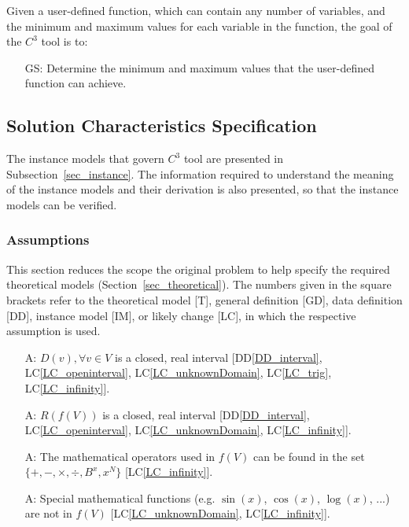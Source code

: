 \documentclass[12pt]{article}
\newcommand{\ddref}[1]{DD\ref{#1}}
\newcounter{assumpnum} %
\newcounter{goalnum} %
\newcommand{\lcref}[1]{LC\ref{#1}}
\newcommand{\prognameAbbrv}{$C^{3}$}
\begin{document}
\noindent Given a user-defined function, which can contain any number of 
variables, and the minimum and maximum values for each variable in the 
function, the goal of the \prognameAbbrv{} tool is to:

\begin{itemize}

\item[GS\refstepcounter{goalnum}\thegoalnum \label{G_range}:] Determine the 
minimum and maximum values that the user-defined function can achieve.


\end{itemize}

\subsection{Solution Characteristics Specification}
The instance models that govern \prognameAbbrv{} tool are presented in
Subsection~\ref{sec_instance}. The information required to understand the 
meaning of the instance models and their derivation is also presented, so that 
the instance models can be verified.

\subsubsection{Assumptions}
This section reduces the scope the original problem to help specify the 
required theoretical models (Section~\ref{sec_theoretical}). The numbers given 
in the square brackets refer to the theoretical model [T], general definition 
[GD], data definition [DD], instance model [IM], or likely change [LC], in 
which the respective assumption is used.

\begin{itemize}

\item[A\refstepcounter{assumpnum}\theassumpnum \label{A_domain}:] $D(v), 
\forall v \in V$ is a closed, real interval [\ddref{DD_interval}, 
\lcref{LC_openinterval}, \lcref{LC_unknownDomain}, \lcref{LC_trig}, 
\lcref{LC_infinity}]. 

\item[A\refstepcounter{assumpnum}\theassumpnum \label{A_interval}:] $R(f(V))$ 
is a closed, real interval [\ddref{DD_interval}, \lcref{LC_openinterval}, 
\lcref{LC_unknownDomain}, \lcref{LC_infinity}].

\item[A\refstepcounter{assumpnum}\theassumpnum \label{A_operators}:] The 
mathematical operators used in $f(V)$ can be found in the set $\{+, -, 
\times, \div, B^x, x^N \}$ [\lcref{LC_infinity}].

\item[A\refstepcounter{assumpnum}\theassumpnum \label{A_commonfunctions}:] 
Special mathematical functions (e.g. $\sin(x)$, $\cos(x)$, $\log(x)$, ...) are 
not in $f(V)$ [\lcref{LC_unknownDomain}, \lcref{LC_infinity}].

\end{itemize}
\end{document}
